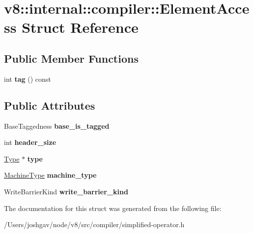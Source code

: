 \hypertarget{structv8_1_1internal_1_1compiler_1_1_element_access}{}\section{v8\+:\+:internal\+:\+:compiler\+:\+:Element\+Access Struct Reference}
\label{structv8_1_1internal_1_1compiler_1_1_element_access}
\subsection*{Public Member Functions}
\begin{DoxyCompactItemize}
\item 
int {\bfseries tag} () const \hypertarget{structv8_1_1internal_1_1compiler_1_1_element_access_a5b61993c7626f7d1bdedfe37a03a63dc}{}\label{structv8_1_1internal_1_1compiler_1_1_element_access_a5b61993c7626f7d1bdedfe37a03a63dc}

\end{DoxyCompactItemize}
\subsection*{Public Attributes}
\begin{DoxyCompactItemize}
\item 
Base\+Taggedness {\bfseries base\+\_\+is\+\_\+tagged}\hypertarget{structv8_1_1internal_1_1compiler_1_1_element_access_a32169a0173a4c6afc14b8b790ea64963}{}\label{structv8_1_1internal_1_1compiler_1_1_element_access_a32169a0173a4c6afc14b8b790ea64963}

\item 
int {\bfseries header\+\_\+size}\hypertarget{structv8_1_1internal_1_1compiler_1_1_element_access_ae5a391794f3839d40c4d6b7cc67f39bc}{}\label{structv8_1_1internal_1_1compiler_1_1_element_access_ae5a391794f3839d40c4d6b7cc67f39bc}

\item 
\hyperlink{classv8_1_1internal_1_1_type}{Type} $\ast$ {\bfseries type}\hypertarget{structv8_1_1internal_1_1compiler_1_1_element_access_ad573cfbf06381763cca0d9d2f253b979}{}\label{structv8_1_1internal_1_1compiler_1_1_element_access_ad573cfbf06381763cca0d9d2f253b979}

\item 
\hyperlink{classv8_1_1internal_1_1_machine_type}{Machine\+Type} {\bfseries machine\+\_\+type}\hypertarget{structv8_1_1internal_1_1compiler_1_1_element_access_a154cc048cda190dce9ec53d77da91f47}{}\label{structv8_1_1internal_1_1compiler_1_1_element_access_a154cc048cda190dce9ec53d77da91f47}

\item 
Write\+Barrier\+Kind {\bfseries write\+\_\+barrier\+\_\+kind}\hypertarget{structv8_1_1internal_1_1compiler_1_1_element_access_af7757c8f131f02cbb372cc0f7ed5e707}{}\label{structv8_1_1internal_1_1compiler_1_1_element_access_af7757c8f131f02cbb372cc0f7ed5e707}

\end{DoxyCompactItemize}


The documentation for this struct was generated from the following file\+:\begin{DoxyCompactItemize}
\item 
/\+Users/joshgav/node/v8/src/compiler/simplified-\/operator.\+h\end{DoxyCompactItemize}

